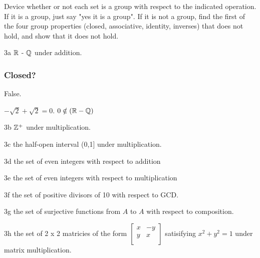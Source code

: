 \begin{question}{3}
Device whether or not each set is a group with respect to the indicated operation. If it is a group, just say "yes it is a group". If it is not a group, find the first of the four group properties (closed, associative, identity, inverses) that does not hold, and show that it does not hold.
\end{question}

\begin{question}{3a}
$\mathbb{R}$ - $\mathbb{Q}$ under addition.
\end{question}

\subsubsection*{Closed?} False.

$-\sqrt{2} + \sqrt{2} = 0$. $0 \notin (\mathbb{R}-\mathbb{Q})$


\begin{question}{3b}
$\mathbb{Z}^+$ under multiplication.
\end{question}


\begin{question}{3c}
the half-open interval (0,1] under multiplication.
\end{question}


\begin{question}{3d}
the set of even integers with respect to addition
\end{question}


\begin{question}{3e}
the set of even integers with respect to multiplication
\end{question}


\begin{question}{3f}
the set of positive divisors of 10 with respect to GCD.
\end{question}


\begin{question}{3g}
the set of surjective functions from $A$ to $A$ with respect to composition.
\end{question}


\begin{question}{3h}
the set of 2 x 2 matricies of the form $\begin{bmatrix}
  x & -y \\
  y & x  \\
 \end{bmatrix}$ satisifying $x^2 + y^2 = 1$ under matrix multiplication.

\end{question}


